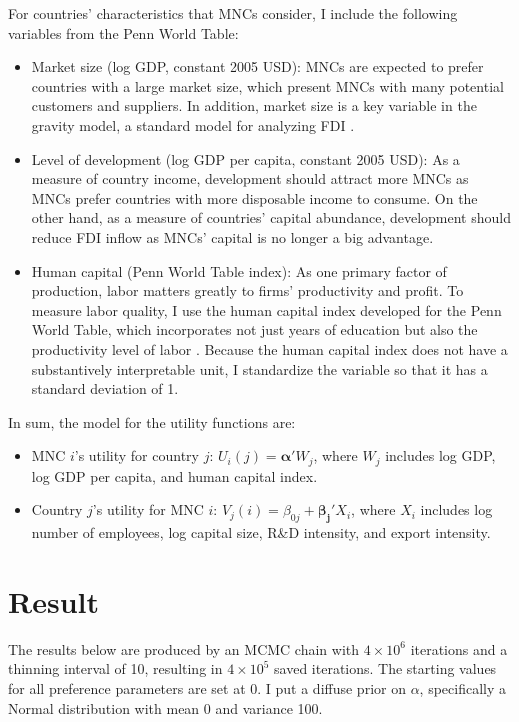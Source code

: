 For countries' characteristics that MNCs consider, I include the following
variables from the Penn World Table:

\begin{itemize}
\item Market size (log GDP, constant 2005 USD): MNCs are expected to prefer countries with a large market
  size, which present MNCs with many potential customers and suppliers. In
  addition, market size is a key variable in the gravity
  model, a standard model for analyzing FDI \citep{Bergstrand2007}.

\item Level of development (log GDP per capita, constant 2005 USD): As a measure
  of country income, development should attract more MNCs as MNCs prefer
  countries  with
  more disposable income to consume. On the other hand, as a measure of
  countries' capital
  abundance, development should reduce FDI inflow as MNCs' capital is no longer
  a big advantage.

\item Human capital (Penn World Table index): As one primary factor of
  production, labor matters greatly to firms' productivity and profit. To
  measure labor quality, I use the human capital index developed for the Penn World
  Table, which incorporates not just years of education but also the
  productivity level of labor
  \citep{Feenstra2015}. Because the human capital index does not have a
  substantively interpretable unit, I standardize the variable so that it has a
  standard deviation of 1.
\end{itemize}

In sum, the model for the utility functions are:

\begin{itemize}
\item MNC $i$'s utility for country $j$: $U_i(j) = \bm{\alpha}' W_j $, where $W_j$ includes log GDP, log GDP per capita, and human capital index.
\item Country $j$'s utility for MNC $i$: $V_j(i) = \beta_{0j} + \bm{\beta_j}'
  X_i$, where $X_i$ includes log number of employees, log capital size, R\&D intensity, and
export intensity. 
\end{itemize}

\section{Result}
\label{sec:Japan_result}

The results below are produced by an MCMC chain with $4 \times 10^6$ iterations and a
thinning interval of 10, resulting in $4 \times 10^5$ saved iterations. The starting
values for all preference parameters are set at 0. I put a diffuse prior on
$\alpha$, specifically a Normal distribution with mean 0 and variance 100.

